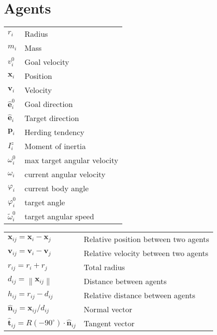 \section{Agents}
\begin{table}[H]
\centering
\begin{tabular}{ll}
$ r_{i} $                    & Radius            \\
$ m_{i} $                    & Mass              \\
$ v_{i}^{0} $                & Goal velocity     \\  
$ \mathbf{x}_{i} $           & Position          \\
$ \mathbf{v}_{i} $           & Velocity          \\
$ \hat{\mathbf{e}}_{i}^{0} $ & Goal direction    \\
$ \hat{\mathbf{e}}_{i} $     & Target direction  \\
$ \mathbf{p}_i $             & Herding tendency  \\
$ I_{i}^{z} $                & Moment of inertia  \\
$ \omega_{i}^{0} $           & max target angular velocity  \\
$ \omega_{i} $               & current angular velocity  \\
$ \varphi_{i} $              & current body angle  \\
$ \varphi_{i}^{0} $          & target angle  \\
$ \tilde{\omega}_{i}^{0} $   & target angular speed \\
\end{tabular}
\end{table}

\begin{table}[H]
\centering
\begin{tabular}{ll}
$ \mathbf{x}_{ij} = \mathbf{x}_{i} - \mathbf{x}_{j} $ & Relative position between two agents \\
$ \mathbf{v}_{ij} = \mathbf{v}_{i} - \mathbf{v}_{j} $ & Relative velocity between two agents \\
$ r_{ij} = r_{i} + r_{j} $ & Total radius \\
$ d_{ij} = \left\|\mathbf{x}_{ij}\right\| $ & Distance between agents \\
$ h_{ij} = r_{ij} - d_{ij} $ & Relative distance between agents \\
$ \hat{\mathbf{n}}_{ij} = \mathbf{x}_{ij} / d_{ij} $ & Normal vector \\
$ \hat{\mathbf{t}}_{ij} = R(-90^{\circ}) \cdot \hat{\mathbf{n}}_{ij} $ & Tangent vector \\
\end{tabular}
\end{table}


